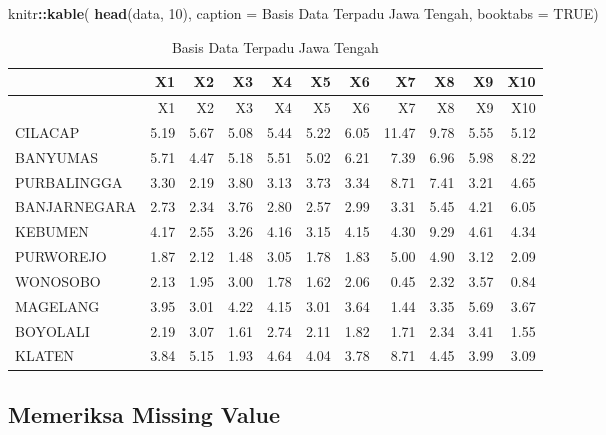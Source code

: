 \documentclass[
]{elegantbook}
\newenvironment{Shaded}{\begin{snugshade}}{\end{snugshade}}
\newcommand{\AttributeTok}[1]{\textcolor[rgb]{0.13,0.29,0.53}{#1}}
\newcommand{\ConstantTok}[1]{\textcolor[rgb]{0.56,0.35,0.01}{#1}}
\newcommand{\DecValTok}[1]{\textcolor[rgb]{0.00,0.00,0.81}{#1}}
\newcommand{\FunctionTok}[1]{\textcolor[rgb]{0.13,0.29,0.53}{\textbf{#1}}}
\newcommand{\NormalTok}[1]{#1}
\newcommand{\SpecialCharTok}[1]{\textcolor[rgb]{0.81,0.36,0.00}{\textbf{#1}}}
\newcommand{\StringTok}[1]{\textcolor[rgb]{0.31,0.60,0.02}{#1}}
\begin{document}
\begin{Shaded}
\begin{Highlighting}[]
\NormalTok{knitr}\SpecialCharTok{::}\FunctionTok{kable}\NormalTok{(}
  \FunctionTok{head}\NormalTok{(data, }\DecValTok{10}\NormalTok{), }\AttributeTok{caption =} \StringTok{\textquotesingle{}Basis Data Terpadu Jawa Tengah\textquotesingle{}}\NormalTok{,}
  \AttributeTok{booktabs =} \ConstantTok{TRUE}\NormalTok{)}
\end{Highlighting}
\end{Shaded}

\begin{longtable}[]{@{}lrrrrrrrrrr@{}}
\caption{\label{tab:nice-tab}Basis Data Terpadu Jawa Tengah}\tabularnewline
\toprule\noalign{}
& X1 & X2 & X3 & X4 & X5 & X6 & X7 & X8 & X9 & X10 \\
\midrule\noalign{}
\endfirsthead
\toprule\noalign{}
& X1 & X2 & X3 & X4 & X5 & X6 & X7 & X8 & X9 & X10 \\
\midrule\noalign{}
\endhead
\bottomrule\noalign{}
\endlastfoot
CILACAP & 5.19 & 5.67 & 5.08 & 5.44 & 5.22 & 6.05 & 11.47 & 9.78 & 5.55 & 5.12 \\
BANYUMAS & 5.71 & 4.47 & 5.18 & 5.51 & 5.02 & 6.21 & 7.39 & 6.96 & 5.98 & 8.22 \\
PURBALINGGA & 3.30 & 2.19 & 3.80 & 3.13 & 3.73 & 3.34 & 8.71 & 7.41 & 3.21 & 4.65 \\
BANJARNEGARA & 2.73 & 2.34 & 3.76 & 2.80 & 2.57 & 2.99 & 3.31 & 5.45 & 4.21 & 6.05 \\
KEBUMEN & 4.17 & 2.55 & 3.26 & 4.16 & 3.15 & 4.15 & 4.30 & 9.29 & 4.61 & 4.34 \\
PURWOREJO & 1.87 & 2.12 & 1.48 & 3.05 & 1.78 & 1.83 & 5.00 & 4.90 & 3.12 & 2.09 \\
WONOSOBO & 2.13 & 1.95 & 3.00 & 1.78 & 1.62 & 2.06 & 0.45 & 2.32 & 3.57 & 0.84 \\
MAGELANG & 3.95 & 3.01 & 4.22 & 4.15 & 3.01 & 3.64 & 1.44 & 3.35 & 5.69 & 3.67 \\
BOYOLALI & 2.19 & 3.07 & 1.61 & 2.74 & 2.11 & 1.82 & 1.71 & 2.34 & 3.41 & 1.55 \\
KLATEN & 3.84 & 5.15 & 1.93 & 4.64 & 4.04 & 3.78 & 8.71 & 4.45 & 3.99 & 3.09 \\
\end{longtable}

\hypertarget{memeriksa-missing-value}{%
\subsection{Memeriksa Missing Value}\label{memeriksa-missing-value}}
\end{document}
